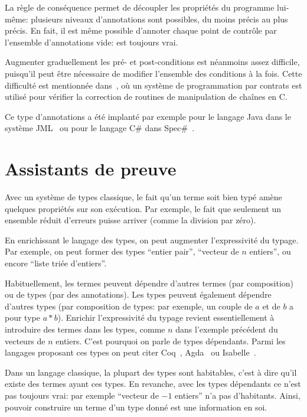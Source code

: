 
La règle de conséquence permet de découpler les propriétés du programme
lui-même: plusieurs niveaux d'annotations sont possibles, du moins précis au
plus précis. En fait, il est même possible d'annoter chaque point de contrôle
par l'ensemble d'annotations vide:  est toujours vrai.

Augmenter graduellement les pré- et post-conditions est néanmoins assez
difficile, puisqu'il peut être nécessaire de modifier l'ensemble des conditions
à la fois. Cette difficulté est mentionnée dans~\cite{cssv}, où un système de
programmation par contrats est utilisé pour vérifier la correction de routines
de manipulation de chaînes en C.

Ce type d'annotations a été implanté par exemple pour le langage Java dans le
système JML~\cite{jmlkluwer} ou pour le langage C\# dans Spec\#~\cite{krml136}.


\section{Assistants de preuve}

Avec un système de types classique, le fait qu'un terme soit bien typé amène
quelques propriétés sur son exécution. Par exemple, le fait que seulement un
ensemble réduit d'erreurs puisse arriver (comme la division par zéro).

En enrichissant le langage des types, on peut augmenter l'expressivité du
typage. Par exemple, on peut former des types ``entier pair'', ``vecteur de $n$
entiers'', ou encore ``liste triée d'entiers''.

Habituellement, les termes peuvent dépendre d'autres termes (par composition) ou
de types (par des annotations). Les types peuvent également dépendre d'autres
types (par composition de types: par exemple, un couple de $a$ et de $b$ a pour
type $a * b$). Enrichir l'expressivité du typage revient essentiellement à
introduire des termes dans les types, comme $n$ dans l'exemple précédent du
vecteurs de $n$ entiers. C'est pourquoi on parle de types dépendants. Parmi les
langages proposant ces types on peut citer Coq~\cite{coqmanual},
Agda~\cite{agdatutorial} ou Isabelle~\cite{isabelletutorial}.

Dans un langage classique, la plupart des types sont habitables, c'est à dire
qu'il existe des termes ayant ces types. En revanche, avec les types dépendants
ce n'est pas toujours vrai: par exemple ``vecteur de $-1$ entiers'' n'a pas
d'habitants. Ainsi, pouvoir construire un terme d'un type donné est une
information en soi.

